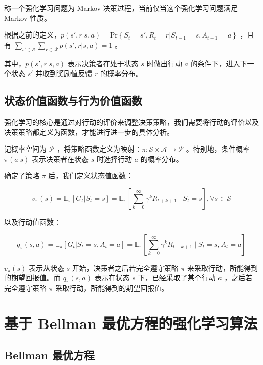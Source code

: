 \begin{Definition}
    称一个强化学习问题为 Markov 决策过程，当前仅当这个强化学习问题满足 Markov 性质\cite{sutton2018reinforcement}\cite{howard1960dynamic}。
\end{Definition}

根据之前的定义，$p(s',r|s,a) =\mathrm{Pr}\left\{S_t=s',R_t=r|S_{t-1}=s,A_{t-1}=a\right\}$ ，且有 $\sum_{s'\in\mathcal{S}}\sum_{r\in\mathcal{R}}p(s',r|s,a)=1$ 。

其中，$p(s',r|s,a)$ 表示决策者在处于状态 $s$ 时做出行动 $a$ 的条件下，进入下一个状态 $s'$ 并收到奖励值反馈 $r$ 的概率分布。

\subsection{状态价值函数与行为价值函数}

强化学习的核心是通过对行动的评价来调整决策策略，我们需要将行动的评价以及决策策略都定义为函数，才能进行进一步的具体分析。

记概率空间为 $\mathcal P$ ，将策略函数定义为映射：$\pi:\mathcal{S}\times\mathcal{A}\to \mathcal{P}$ 。特别地，条件概率 $\pi(a|s)$ 表示决策者在状态 $s$ 时选择行动 $a$ 的概率分布。

确定了策略 $\pi$ 后，我们定义状态值函数：

\begin{equation}
    v_{\pi}(s) =\mathbb{E}_{\pi}\left[G_t|S_t=s\right]=\mathbb{E}_{\pi}\left[\sum_{k=0}^{\infty}\gamma^kR_{t+k+1}\mid S_t=s\right], \forall s \in \mathcal{S}
\end{equation}

以及行动值函数：

\begin{equation}
    q_{\pi}(s,a) =\mathbb{E}_{\pi}\left[G_t|S_t=s,A_t=a\right]=\mathbb{E}_{\pi}\left[\sum_{k=0}^{\infty}\gamma^kR_{t+k+1}\mid S_t=s,A_t=a\right]
\end{equation}

$v_\pi(s)$ 表示从状态 $s$ 开始，决策者之后若完全遵守策略 $\pi$ 来采取行动，所能得到的期望回报值。而 $q_\pi(s,a)$ 表示在状态 $s$ 下，已经采取了某个行动 $a$ ，之后若完全遵守策略 $\pi$ 采取行动，所能得到的期望回报值。

\section{基于 Bellman 最优方程的强化学习算法}

\subsection{Bellman 最优方程}

